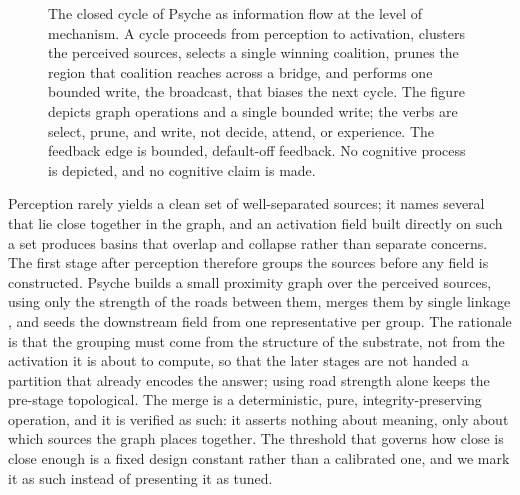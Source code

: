\documentclass[11pt]{article}
\begin{document}
\begin{figure}[t]
  \centering
  \caption{The closed cycle of Psyche as information flow at the level of mechanism. A
    cycle proceeds from perception to activation, clusters the perceived sources,
    selects a single winning coalition, prunes the region that coalition reaches across
    a bridge, and performs one bounded write, the broadcast, that biases the next
    cycle. The figure depicts graph operations and a single bounded write; the verbs
    are select, prune, and write, not decide, attend, or experience. The feedback edge
    is bounded, default-off feedback. No cognitive process is depicted, and no
    cognitive claim is made.}
  \label{fig:cycle}
\end{figure}

Perception rarely yields a clean set of well-separated sources; it names several that
lie close together in the graph, and an activation field built directly on such a set
produces basins that overlap and collapse rather than separate concerns. The first
stage after perception therefore groups the sources before any field is constructed.
Psyche builds a small proximity graph over the perceived sources, using only the
strength of the roads between them, merges them by single linkage \citep{sibson1973slink}, and seeds the
downstream field from one representative per group. The rationale is that the grouping
must come from the structure of the substrate, not from the activation it is about to
compute, so that the later stages are not handed a partition that already encodes the
answer; using road strength alone keeps the pre-stage topological. The merge is a
deterministic, pure, integrity-preserving operation, and it is verified as such: it
asserts nothing about meaning, only about which sources the graph places together. The
threshold that governs how close is close enough is a fixed design constant rather than
a calibrated one, and we mark it as such instead of presenting it as tuned.
\end{document}
